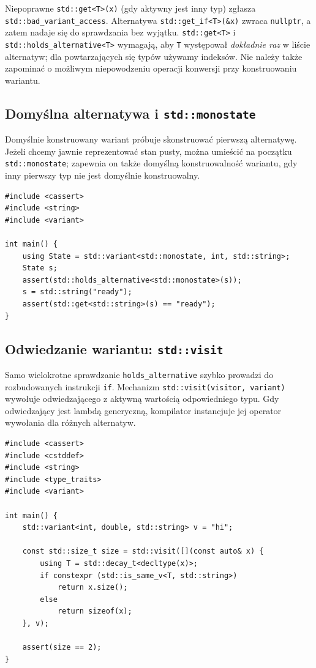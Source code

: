 Niepoprawne \texttt{std::get<T>(x)} (gdy aktywny jest inny typ)
zgłasza \texttt{std::bad\_variant\_access}. Alternatywa
\texttt{std::get\_if<T>(\&x)} zwraca \texttt{nullptr}, a zatem nadaje się
do sprawdzania bez wyjątku. \texttt{std::get<T>} i
\texttt{std::holds\_alternative<T>} wymagają, aby \texttt{T} występował
\emph{dokładnie raz} w liście alternatyw; dla powtarzających się typów
używamy indeksów. Nie należy także zapominać o możliwym niepowodzeniu
operacji konwersji przy konstruowaniu wariantu.

\subsection{Domyślna alternatywa i \texttt{std::monostate}}

Domyślnie konstruowany wariant próbuje skonstruować pierwszą alternatywę.
Jeżeli chcemy jawnie reprezentować stan pusty, można umieścić na początku
\texttt{std::monostate}; zapewnia on także domyślną konstruowalność
wariantu, gdy inny pierwszy typ nie jest domyślnie konstruowalny.

\begin{lstlisting}[caption={Jawny stan początkowy monostate; kompletny program.}]
#include <cassert>
#include <string>
#include <variant>

int main() {
    using State = std::variant<std::monostate, int, std::string>;
    State s;
    assert(std::holds_alternative<std::monostate>(s));
    s = std::string("ready");
    assert(std::get<std::string>(s) == "ready");
}
\end{lstlisting}

\subsection{Odwiedzanie wariantu: \texttt{std::visit}}

Samo wielokrotne sprawdzanie \texttt{holds\_alternative} szybko
prowadzi do rozbudowanych instrukcji \texttt{if}. Mechanizm
\texttt{std::visit(visitor, variant)} wywołuje odwiedzającego z aktywną
wartością odpowiedniego typu. Gdy odwiedzający jest lambdą generyczną,
kompilator instancjuje jej operator wywołania dla różnych alternatyw.

\begin{lstlisting}[caption={Jeden odwiedzający generyczny; kompletny program.}]
#include <cassert>
#include <cstddef>
#include <string>
#include <type_traits>
#include <variant>

int main() {
    std::variant<int, double, std::string> v = "hi";

    const std::size_t size = std::visit([](const auto& x) {
        using T = std::decay_t<decltype(x)>;
        if constexpr (std::is_same_v<T, std::string>)
            return x.size();
        else
            return sizeof(x);
    }, v);

    assert(size == 2);
}
\end{lstlisting}

